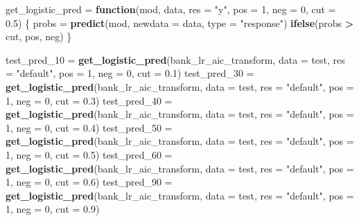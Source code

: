 \documentclass[
]{article}
\newenvironment{Shaded}{\begin{snugshade}}{\end{snugshade}}
\newcommand{\ControlFlowTok}[1]{\textcolor[rgb]{0.13,0.29,0.53}{\textbf{#1}}}
\newcommand{\DataTypeTok}[1]{\textcolor[rgb]{0.13,0.29,0.53}{#1}}
\newcommand{\DecValTok}[1]{\textcolor[rgb]{0.00,0.00,0.81}{#1}}
\newcommand{\FloatTok}[1]{\textcolor[rgb]{0.00,0.00,0.81}{#1}}
\newcommand{\KeywordTok}[1]{\textcolor[rgb]{0.13,0.29,0.53}{\textbf{#1}}}
\newcommand{\NormalTok}[1]{#1}
\newcommand{\OperatorTok}[1]{\textcolor[rgb]{0.81,0.36,0.00}{\textbf{#1}}}
\newcommand{\StringTok}[1]{\textcolor[rgb]{0.31,0.60,0.02}{#1}}
\begin{document}
\begin{Shaded}
\begin{Highlighting}[]
\NormalTok{get_logistic_pred =}\StringTok{ }\ControlFlowTok{function}\NormalTok{(mod, data, }\DataTypeTok{res =} \StringTok{"y"}\NormalTok{, }\DataTypeTok{pos =} \DecValTok{1}\NormalTok{, }\DataTypeTok{neg =} \DecValTok{0}\NormalTok{, }\DataTypeTok{cut =} \FloatTok{0.5}\NormalTok{) \{}
\NormalTok{  probs =}\StringTok{ }\KeywordTok{predict}\NormalTok{(mod, }\DataTypeTok{newdata =}\NormalTok{ data, }\DataTypeTok{type =} \StringTok{"response"}\NormalTok{)}
  \KeywordTok{ifelse}\NormalTok{(probs }\OperatorTok{>}\StringTok{ }\NormalTok{cut, pos, neg)}
\NormalTok{\}}

\NormalTok{test_pred_}\DecValTok{10}\NormalTok{ =}\StringTok{ }\KeywordTok{get_logistic_pred}\NormalTok{(bank_lr_aic_transform, }\DataTypeTok{data =}\NormalTok{ test, }\DataTypeTok{res =} \StringTok{"default"}\NormalTok{, }
                                 \DataTypeTok{pos =} \DecValTok{1}\NormalTok{, }\DataTypeTok{neg =} \DecValTok{0}\NormalTok{, }\DataTypeTok{cut =} \FloatTok{0.1}\NormalTok{)}
\NormalTok{test_pred_}\DecValTok{30}\NormalTok{ =}\StringTok{ }\KeywordTok{get_logistic_pred}\NormalTok{(bank_lr_aic_transform, }\DataTypeTok{data =}\NormalTok{ test, }\DataTypeTok{res =} \StringTok{"default"}\NormalTok{, }
                                 \DataTypeTok{pos =} \DecValTok{1}\NormalTok{, }\DataTypeTok{neg =} \DecValTok{0}\NormalTok{, }\DataTypeTok{cut =} \FloatTok{0.3}\NormalTok{)}
\NormalTok{test_pred_}\DecValTok{40}\NormalTok{ =}\StringTok{ }\KeywordTok{get_logistic_pred}\NormalTok{(bank_lr_aic_transform, }\DataTypeTok{data =}\NormalTok{ test, }\DataTypeTok{res =} \StringTok{"default"}\NormalTok{, }
                                 \DataTypeTok{pos =} \DecValTok{1}\NormalTok{, }\DataTypeTok{neg =} \DecValTok{0}\NormalTok{, }\DataTypeTok{cut =} \FloatTok{0.4}\NormalTok{)}
\NormalTok{test_pred_}\DecValTok{50}\NormalTok{ =}\StringTok{ }\KeywordTok{get_logistic_pred}\NormalTok{(bank_lr_aic_transform, }\DataTypeTok{data =}\NormalTok{ test, }\DataTypeTok{res =} \StringTok{"default"}\NormalTok{, }
                                 \DataTypeTok{pos =} \DecValTok{1}\NormalTok{, }\DataTypeTok{neg =} \DecValTok{0}\NormalTok{, }\DataTypeTok{cut =} \FloatTok{0.5}\NormalTok{)}
\NormalTok{test_pred_}\DecValTok{60}\NormalTok{ =}\StringTok{ }\KeywordTok{get_logistic_pred}\NormalTok{(bank_lr_aic_transform, }\DataTypeTok{data =}\NormalTok{ test, }\DataTypeTok{res =} \StringTok{"default"}\NormalTok{, }
                                 \DataTypeTok{pos =} \DecValTok{1}\NormalTok{, }\DataTypeTok{neg =} \DecValTok{0}\NormalTok{, }\DataTypeTok{cut =} \FloatTok{0.6}\NormalTok{)}
\NormalTok{test_pred_}\DecValTok{90}\NormalTok{ =}\StringTok{ }\KeywordTok{get_logistic_pred}\NormalTok{(bank_lr_aic_transform, }\DataTypeTok{data =}\NormalTok{ test, }\DataTypeTok{res =} \StringTok{"default"}\NormalTok{, }
                                 \DataTypeTok{pos =} \DecValTok{1}\NormalTok{, }\DataTypeTok{neg =} \DecValTok{0}\NormalTok{, }\DataTypeTok{cut =} \FloatTok{0.9}\NormalTok{)}


\end{Highlighting}
\end{Shaded}
\end{document}

